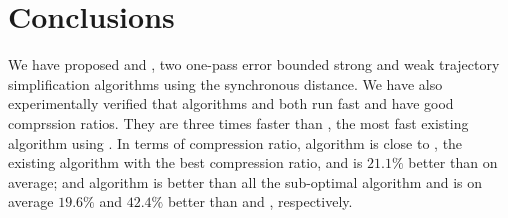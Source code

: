 \vspace{-1ex}
\section{Conclusions}  %
\label{sec-conclusion}

We have proposed \cist and \cista, two one-pass error bounded strong and weak trajectory simplification algorithms using the synchronous distance.
We have also experimentally verified that algorithms \cist and \cista both run fast and have good comprssion ratios.
They are three times faster than \squishe, the most fast existing \lsa algorithm using \sed.
%
In terms of compression ratio,
algorithm \cist is close to \dps, the existing \lsa algorithm with the best compression ratio, and is $21.1\%$ better than \squishe on average; and algorithm \cista is better than all the sub-optimal algorithm and is on average $19.6\%$ and $42.4\%$ better than \dps and \squishe, respectively.

